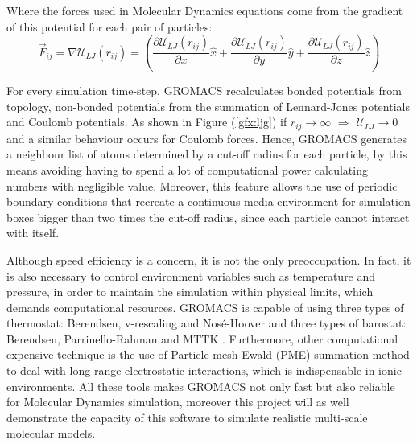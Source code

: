 \documentclass[10pt,a4paper,twoside]{article}
\begin{document}
Where the forces used in Molecular Dynamics equations come from the gradient of this potential for each pair of particles:
\begin{equation}
\vec{F}_{ij} = \nabla\mathcal{U}_{LJ}(r_{ij}) = \left( \dfrac{\partial\mathcal{U}_{LJ}(r_{ij})}{\partial x}\hat{x} + \dfrac{\partial\mathcal{U}_{LJ}(r_{ij})}{\partial y}\hat{y}+\dfrac{\partial\mathcal{U}_{LJ}(r_{ij})}{\partial z}\hat{z}\right) 
\label{eqn:ljf}
\end{equation}

For every simulation time-step, GROMACS recalculates bonded potentials from topology, non-bonded potentials from the summation of Lennard-Jones potentials and Coulomb potentials. As shown in Figure (\ref{gfx:ljg}) if $r_{ij} \rightarrow \infty$ $\Rightarrow$ $\mathcal{U}_{LJ} \rightarrow 0$ and a similar behaviour occurs for Coulomb forces. Hence, GROMACS generates a neighbour list of atoms determined by a cut-off radius for each particle, by this means avoiding having to spend a lot of computational power calculating numbers with negligible value. Moreover, this feature allows the use of periodic boundary conditions that recreate a continuous media environment for simulation boxes bigger than  two times the cut-off radius, since each particle cannot interact with itself. 

Although speed efficiency is a concern, it is not the only preoccupation. In fact, it is also necessary to control environment variables such as temperature and pressure, in order to maintain the simulation within physical limits, which demands computational resources. GROMACS is capable of using three types of thermostat: Berendsen, v-rescaling and Nosé-Hoover and three types of barostat: Berendsen, Parrinello-Rahman and MTTK \cite{gromanual}. Furthermore, other computational expensive technique is the use of Particle-mesh Ewald (PME) summation method \cite{ewald} to deal with long-range electrostatic interactions, which is indispensable in ionic environments. All these tools makes GROMACS not only fast but also reliable for Molecular Dynamics simulation, moreover this project will as well demonstrate the capacity of this software to simulate realistic multi-scale molecular models.
  
\end{document}

